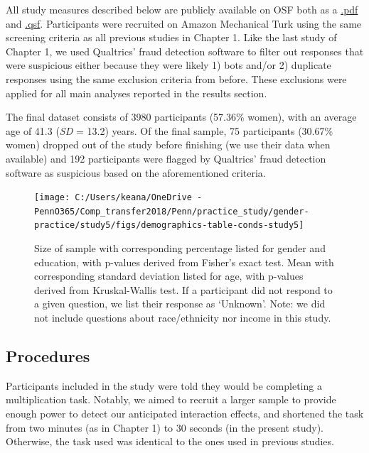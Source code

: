 \documentclass[a4paper, nobind]{templates/ociamthesis}
\begin{document}
All study measures described below are publicly available on OSF both as a \href{https://osf.io/xbrvs/}{.pdf} and \href{https://osf.io/4mvyr/}{.qsf}. Participants were recruited on Amazon Mechanical Turk using the same screening criteria as all previous studies in Chapter 1. Like the last study of Chapter 1, we used Qualtrics' fraud detection software to filter out responses that were suspicious either because they were likely 1) bots and/or 2) duplicate responses using the same exclusion criteria from before. These exclusions were applied for all main analyses reported in the results section.

The final dataset consists of 3980 participants (57.36\% women), with an average age of 41.3 (\emph{SD} = 13.2) years. Of the final sample, 75 participants (30.67\% women) dropped out of the study before finishing (we use their data when available) and 192 participants were flagged by Qualtrics' fraud detection software as suspicious based on the aforementioned criteria.

\begin{figure}

{\centering \texttt{[image: C:/Users/keana/OneDrive - PennO365/Comp\_transfer2018/Penn/practice\_study/gender-practice/study5/figs/demographics-table-conds-study5]} 

}

\caption{Size of sample with corresponding percentage listed for gender and education, with p-values derived from Fisher’s exact test. Mean with corresponding standard deviation listed for age, with p-values derived from Kruskal-Wallis test. If a participant did not respond to a given question, we list their response as ‘Unknown’. Note: we did not include questions about race/ethnicity nor income in this study.}\label{fig:demographics-table-study5}
\end{figure}

\hypertarget{procedures-3}{%
\subsection{Procedures}\label{procedures-3}}

Participants included in the study were told they would be completing a multiplication task. Notably, we aimed to recruit a larger sample to provide enough power to detect our anticipated interaction effects, and shortened the task from two minutes (as in Chapter 1) to 30 seconds (in the present study). Otherwise, the task used was identical to the ones used in previous studies.
\end{document}
